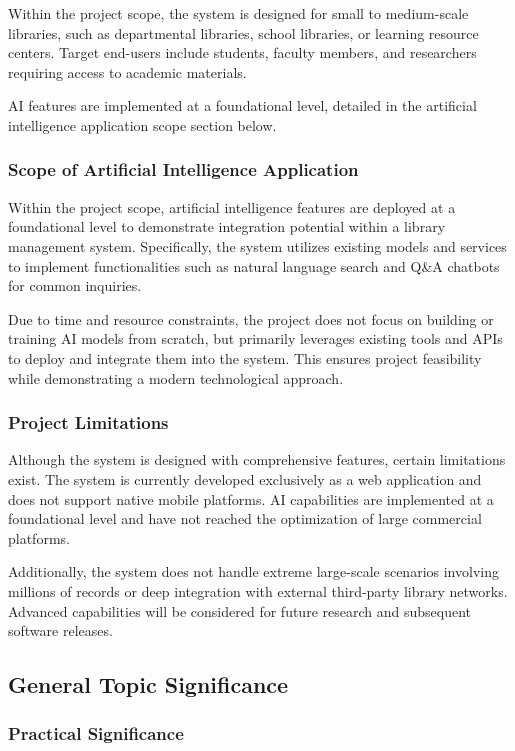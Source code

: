 Within the project scope, the system is designed for small to medium-scale libraries, such as departmental libraries, school libraries, or learning resource centers. Target end-users include students, faculty members, and researchers requiring access to academic materials.

AI features are implemented at a foundational level, detailed in the artificial intelligence application scope section below.

\subsubsection{Scope of Artificial Intelligence Application}

Within the project scope, artificial intelligence features are deployed at a foundational level to demonstrate integration potential within a library management system. Specifically, the system utilizes existing models and services to implement functionalities such as natural language search and Q\&A chatbots for common inquiries.

Due to time and resource constraints, the project does not focus on building or training AI models from scratch, but primarily leverages existing tools and APIs to deploy and integrate them into the system. This ensures project feasibility while demonstrating a modern technological approach.

\subsubsection{Project Limitations}

Although the system is designed with comprehensive features, certain limitations exist. The system is currently developed exclusively as a web application and does not support native mobile platforms. AI capabilities are implemented at a foundational level and have not reached the optimization of large commercial platforms.

Additionally, the system does not handle extreme large-scale scenarios involving millions of records or deep integration with external third-party library networks. Advanced capabilities will be considered for future research and subsequent software releases.

\subsection{General Topic Significance}

\subsubsection{Practical Significance}

